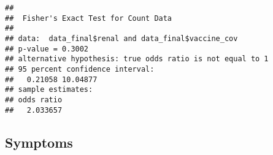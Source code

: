 \documentclass[
]{article}
\newenvironment{Shaded}{\begin{snugshade}}{\end{snugshade}}
\newcommand{\FunctionTok}[1]{\textcolor[rgb]{0.00,0.00,0.00}{#1}}
\newcommand{\NormalTok}[1]{#1}
\newcommand{\SpecialCharTok}[1]{\textcolor[rgb]{0.00,0.00,0.00}{#1}}
\begin{document}
\begin{Shaded}
\end{Shaded}

\begin{verbatim}
## 
##  Fisher's Exact Test for Count Data
## 
## data:  data_final$renal and data_final$vaccine_cov
## p-value = 0.3002
## alternative hypothesis: true odds ratio is not equal to 1
## 95 percent confidence interval:
##   0.21058 10.04877
## sample estimates:
## odds ratio 
##   2.033657
\end{verbatim}

\hypertarget{symptoms}{%
\subsection{Symptoms}\label{symptoms}}
\end{document}
